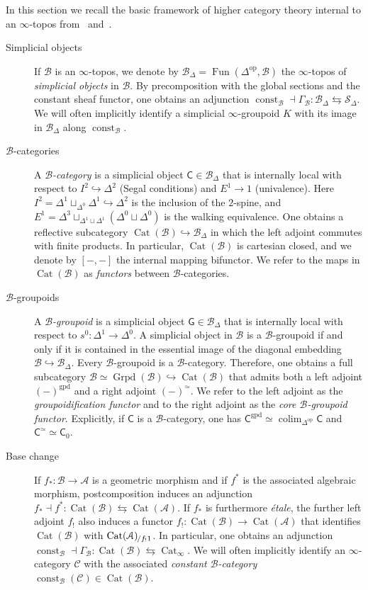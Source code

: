 \documentclass[reqno]{amsart}
\numberwithin{equation}{subsection}
\theoremstyle{plain}
\theoremstyle{definition}
\let\scr=\mathcal
\let\into=\hookrightarrow
\def\AA{\scr A}
\def\BB{\scr B}
\def\CC{\scr C}
\def\SS{\scr S}
\DeclareMathOperator{\Cat}{Cat}
\DeclareMathOperator{\Fun}{Fun}
\DeclareMathOperator{\Grpd}{Grpd}
\DeclareMathOperator{\const}{const}
\newcommand{\op}{\mathrm{op}}
\newcommand{\core}{\simeq}
\newcommand{\gp}{\mathrm{gpd}}
\newcommand{\Over}[2]{#1_{\hspace{-1pt}/#2}}
\newcommand{\I}[1]{\mathsf{#1}}
\newcommand{\iFun}[2]{{[#1,#2]}}
\newcommand{\Simp}[1]{#1_{\Delta}}
\newcommand{\CatS}{\Cat_{\infty}}
\DeclareMathOperator*{\colim}{colim}
\begin{document}
In this section we recall the basic framework of higher category theory internal to an $\infty$-topos from~\cite{Martini2021} and~\cite{Martini2021a}.
\begin{description}
    \item[Simplicial objects] If $\BB$ is an $\infty$-topos, we denote by $\Simp\BB=\Fun(\Delta^{\op},\BB)$ the $\infty$-topos of \emph{simplicial objects} in $\BB$. By precomposition with the global sections and the constant sheaf functor, one obtains an adjunction $\const_{\BB}\dashv \Gamma_{\BB}\colon \Simp\BB\leftrightarrows\Simp\SS$. We will often implicitly identify a simplicial $\infty$-groupoid $K$ with its image in $\Simp\BB$ along $\const_{\BB}$.
    
    \item[$\BB$-categories] A \emph{$\BB$-category} is a simplicial object $\I{C}\in\Simp\BB$ that is internally local with respect to $I^2\into\Delta^2$ (Segal conditions) and $E^1\to 1$ (univalence). Here $I^2=\Delta^1\sqcup_{\Delta^0}\Delta^1\into\Delta^2$ is the inclusion of the $2$-spine, and $E^1=\Delta^3\sqcup_{\Delta^1\sqcup\Delta^1}(\Delta^0\sqcup\Delta^0)$ is the walking equivalence. One obtains a reflective subcategory $\Cat(\BB)\into\Simp\BB$ in which the left adjoint commutes with finite products. In particular, $\Cat(\BB)$ is cartesian closed, and we denote by $\iFun{-}{-}$ the internal mapping bifunctor. We refer to the maps in $\Cat(\BB)$ as \emph{functors} between $\BB$-categories.
    \item[$\BB$-groupoids] A \emph{$\BB$-groupoid} is a simplicial object $\I{G}\in\Simp\BB$ that is internally local with respect to $s^0\colon\Delta^1\to\Delta^0$. A simplicial object in $\BB$ is a $\BB$-groupoid if and only if it is contained in the essential image of the diagonal embedding $\BB\into \Simp\BB$. Every $\BB$-groupoid is a $\BB$-category. Therefore, one obtains a full subcategory $\BB\simeq \Grpd(\BB)\into\Cat(\BB)$ that admits both a left adjoint $(-)^{\gp}$ and a right adjoint $(-)^\core$. We refer to the left adjoint as the \emph{groupoidification functor} and to the right adjoint as the \emph{core $\BB$-groupoid functor}. Explicitly, if $\I{C}$ is a $\BB$-category, one has $\I{C}^\gp \simeq \colim_{\Delta^{\op}}\I{C}$ and $\I{C}^{\simeq}\simeq \I{C}_0$.
    
    \item[Base change] If $f_\ast\colon \BB\to\AA$ is a geometric morphism and if $f^\ast$ is the associated algebraic morphism, postcomposition induces an adjunction $f_\ast\dashv f^\ast\colon \Cat(\BB)\leftrightarrows\Cat(\AA)$. If $f_\ast$ is furthermore \emph{\'etale}, the further left adjoint $f_!$ also induces a functor $f_!\colon \Cat(\BB)\to\Cat(\AA)$ that identifies $\Cat(\BB)$ with $\Over{\Cat(\AA)}{f_! 1}$. In particular, one obtains an adjunction $\const_{\BB}\dashv \Gamma_{\BB}\colon \Cat(\BB)\leftrightarrows \CatS$. We will often implicitly identify an $\infty$-category $\CC$ with the associated \emph{constant $\BB$-category} $\const_{\BB}(\CC)\in\Cat(\BB)$.
    

\end{description}
\end{document}
